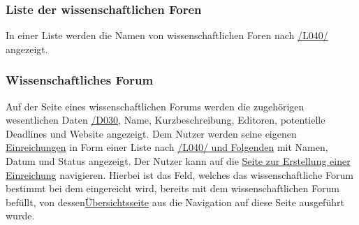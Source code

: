 \subsubsection{Liste der wissenschaftlichen Foren}
\begin{description}
     In einer Liste werden die Namen von wissenschaftlichen Foren nach \hyperref[leist:40]{/L040/}
    angezeigt.
\end{description}

\subsubsection{Wissenschaftliches Forum} \label{nut:wissfor}
\begin{description}
     Auf der Seite eines wissenschaftlichen Forums werden die zugehörigen wesentlichen Daten \hyperref[d030]{/D030},
    Name, Kurzbeschreibung, Editoren, potentielle Deadlines und Website angezeigt.
     Dem Nutzer werden seine eigenen \hyperref[nut:ein]{Einreichungen} in Form einer Liste  nach \hyperref[leist:40]{/L040/ und Folgenden}
    mit Namen, Datum und Status angezeigt.
     Der Nutzer kann auf die \hyperref[nut:eein]{Seite zur Erstellung einer Einreichung} navigieren. Hierbei ist
    das Feld, welches das wissenschaftliche Forum bestimmt bei dem eingereicht wird, bereits mit
    dem wissenschaftlichen Forum befüllt, von dessen\hyperref[nut:wissFor]{Übersichtsseite} aus die Navigation auf diese
    Seite ausgeführt wurde.
\end{description}


